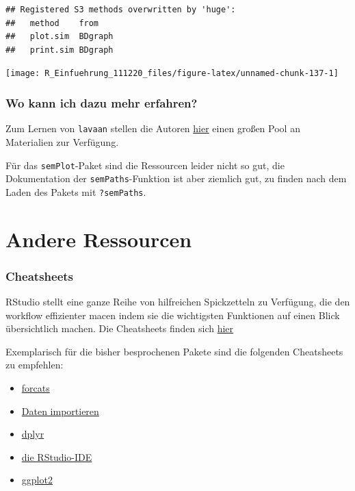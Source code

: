 \documentclass[
]{book}
\begin{document}
\begin{verbatim}
## Registered S3 methods overwritten by 'huge':
##   method    from   
##   plot.sim  BDgraph
##   print.sim BDgraph
\end{verbatim}

\begin{center}\texttt{[image: R\_Einfuehrung\_111220\_files/figure-latex/unnamed-chunk-137-1]} \end{center}

\hypertarget{wo-kann-ich-dazu-mehr-erfahren-4}{%
\subsubsection{Wo kann ich dazu mehr erfahren?}\label{wo-kann-ich-dazu-mehr-erfahren-4}}

Zum Lernen von \texttt{lavaan} stellen die Autoren \href{https://lavaan.ugent.be/resources/teaching.html}{hier} einen großen Pool an Materialien zur Verfügung.

Für das \texttt{semPlot}-Paket sind die Ressourcen leider nicht so gut, die Dokumentation der \texttt{semPaths}-Funktion ist aber ziemlich gut, zu finden nach dem Laden des Pakets mit \texttt{?semPaths}.

\hypertarget{andere-ressourcen}{%
\section{Andere Ressourcen}\label{andere-ressourcen}}

\hypertarget{cheatsheets}{%
\subsubsection{Cheatsheets}\label{cheatsheets}}

RStudio stellt eine ganze Reihe von hilfreichen Spickzetteln zu Verfügung, die den workflow effizienter macen indem sie die wichtigsten Funktionen auf einen Blick übersichtlich machen. Die Cheatsheets finden sich \href{https://rstudio.com/resources/cheatsheets/}{hier}

Exemplarisch für die bisher besprochenen Pakete sind die folgenden Cheatsheets zu empfehlen:

\begin{itemize}
\item
  \href{https://github.com/rstudio/cheatsheets/raw/master/factors.pdf}{forcats}
\item
  \href{https://github.com/rstudio/cheatsheets/raw/master/data-import.pdf}{Daten importieren}
\item
  \href{https://github.com/rstudio/cheatsheets/raw/master/data-transformation.pdf}{dplyr}
\item
  \href{https://github.com/rstudio/cheatsheets/raw/master/rstudio-ide.pdf}{die RStudio-IDE}
\item
  \href{https://github.com/rstudio/cheatsheets/raw/master/data-visualization-2.1.pdf}{ggplot2}
\end{itemize}
\end{document}
